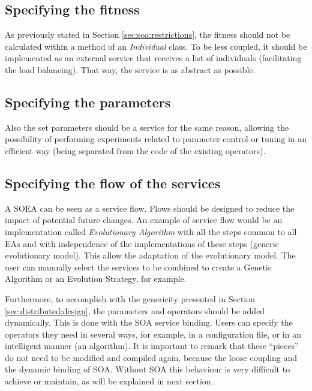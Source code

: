 \subsection{Specifying the fitness}
As previously stated in Section \ref{sec:soa:restrictions}, %
 the fitness should not be calculated within a method of an {\em Individual} class. To be less
coupled, it should be implemented as an external service that receives a list of individuals (facilitating the load balancing). That way, the service is as abstract as possible. 

\subsection{Specifying the parameters}
Also the set parameters should be a service for the same reason, allowing the possibility of performing
experiments related to  parameter control or tuning \cite{ParameterControlEiben07} in an efficient way
(being separated from the code of the existing operators). 

\subsection{Specifying the flow of the services}

A SOEA can be seen as a service flow. Flows should be designed to reduce the impact of potential future changes. An example of service flow would be an implementation called {\em Evolutionary Algorithm} with all the steps common to all EAs and with independence of the implementations of these steps (generic evolutionary model). This allow the adaptation of the evolutionary model. The user can manually
  select the services to be combined to create a Genetic Algorithm or
  an Evolution Strategy, for example.  

  Furthermore, to accomplish with the genericity presented in Section \ref{sec:distributed:design}, the parameters and operators should be added dynamically. This is done with the SOA service binding. Users can specify the operators they need in several ways, for example, in a configuration file, or in an intelligent manner (an algorithm). It is important to remark that these ``pieces'' do not need to be modified and compiled again, because the loose coupling and the dynamic binding of SOA. Without SOA this behaviour is very difficult to achieve or maintain, as will be explained in next section.

